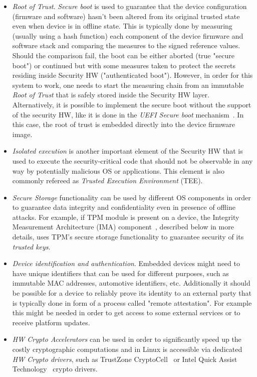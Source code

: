 \begin{itemize}
	\item \textit{Root of Trust}. \textit{Secure boot} is used to guarantee that the device configuration (firmware and software) hasn't been altered from its original trusted state even when device is in offline state. This is typically done by measuring (usually using a hash function) each component of the device firmware and software stack and comparing the measures to the signed reference values. Should the comparison fail, the boot can be either aborted (true "secure boot") or continued but with some measures taken to protect the secrets residing inside Security HW ("authenticated boot"). However, in order for this system to work, one needs to start the measuring chain from an immutable \textit{Root of Trust} that is safely stored inside the Security HW layer. Alternatively, it is possible to implement the secure boot without the support of the security HW, like it is done in the \textit{UEFI Secure boot} mechanism~\cite{uefi}. In this case, the root of trust is embedded directly into the device firmware image. 
	\item \textit{Isolated execution} is another important element of the Security HW that is used to execute the security-critical code that should not be observable in any way by potentially malicious OS or applications. This element is also commonly refereed as \textit{Trusted Execution Environment} (TEE).
	\item \textit{Secure Storage} functionality can be used by different OS components in order to guarantee data integrity and confidentiality even in presence of offline attacks. For example, if TPM module is present on a device, the Integrity Measurement Architecture (IMA) component~\cite{ima}, described below in more details, uses TPM's secure storage functionality to guarantee security of its \textit{trusted keys}.
	\item \textit{Device identification and authentication}. Embedded devices might need to have unique identifiers that can be used for different purposes, such as immutable MAC addresses, automotive identifiers, etc.  Additionally it should be possible for a device to reliably prove its identity to an external party that is typically done in form of a process called "remote attestation". For example this might be needed in order to get access to some external services or to receive platform updates.
	\item \textit{HW Crypto Accelerators} can be used in order to significantly speed up the costly cryptographic computations and in Linux is accessible via dedicated \textit{HW Crypto drivers}, such as TrustZone CryptoCell~\cite{cryptocell} or Intel Quick Assist Technology~\cite{intelQAT} crypto drivers.
\end{itemize}

